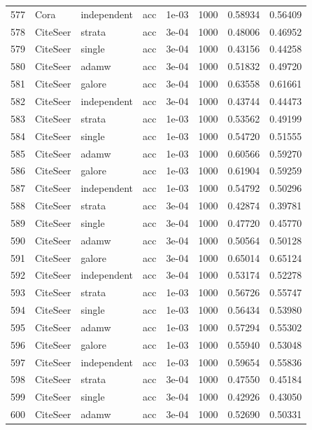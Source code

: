 \begin{longtable}{rlllrrrr}
577 & Cora & independent & acc & 1e-03 & 1000 & 0.58934 & 0.56409 \\
\rowcolor{oursbg}
578 & CiteSeer & strata & acc & 3e-04 & 1000 & 0.48006 & 0.46952 \\
579 & CiteSeer & single & acc & 3e-04 & 1000 & 0.43156 & 0.44258 \\
580 & CiteSeer & adamw & acc & 3e-04 & 1000 & 0.51832 & 0.49720 \\
581 & CiteSeer & galore & acc & 3e-04 & 1000 & 0.63558 & 0.61661 \\
582 & CiteSeer & independent & acc & 3e-04 & 1000 & 0.43744 & 0.44473 \\
\rowcolor{oursbg}
583 & CiteSeer & strata & acc & 1e-03 & 1000 & 0.53562 & 0.49199 \\
584 & CiteSeer & single & acc & 1e-03 & 1000 & 0.54720 & 0.51555 \\
585 & CiteSeer & adamw & acc & 1e-03 & 1000 & 0.60566 & 0.59270 \\
586 & CiteSeer & galore & acc & 1e-03 & 1000 & 0.61904 & 0.59259 \\
587 & CiteSeer & independent & acc & 1e-03 & 1000 & 0.54792 & 0.50296 \\
\rowcolor{oursbg}
588 & CiteSeer & strata & acc & 3e-04 & 1000 & 0.42874 & 0.39781 \\
589 & CiteSeer & single & acc & 3e-04 & 1000 & 0.47720 & 0.45770 \\
590 & CiteSeer & adamw & acc & 3e-04 & 1000 & 0.50564 & 0.50128 \\
591 & CiteSeer & galore & acc & 3e-04 & 1000 & 0.65014 & 0.65124 \\
592 & CiteSeer & independent & acc & 3e-04 & 1000 & 0.53174 & 0.52278 \\
\rowcolor{oursbg}
593 & CiteSeer & strata & acc & 1e-03 & 1000 & 0.56726 & 0.55747 \\
594 & CiteSeer & single & acc & 1e-03 & 1000 & 0.56434 & 0.53980 \\
595 & CiteSeer & adamw & acc & 1e-03 & 1000 & 0.57294 & 0.55302 \\
596 & CiteSeer & galore & acc & 1e-03 & 1000 & 0.55940 & 0.53048 \\
597 & CiteSeer & independent & acc & 1e-03 & 1000 & 0.59654 & 0.55836 \\
\rowcolor{oursbg}
598 & CiteSeer & strata & acc & 3e-04 & 1000 & 0.47550 & 0.45184 \\
599 & CiteSeer & single & acc & 3e-04 & 1000 & 0.42926 & 0.43050 \\
600 & CiteSeer & adamw & acc & 3e-04 & 1000 & 0.52690 & 0.50331 \\

\end{longtable}
